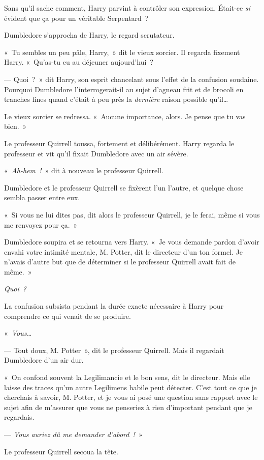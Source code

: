 Sans qu'il sache comment, Harry parvint à contrôler son expression. Était-ce \emph{si} évident que ça pour un véritable Serpentard~?

Dumbledore s'approcha de Harry, le regard scrutateur.

«~Tu sembles un peu pâle, Harry,~» dit le vieux sorcier. Il regarda fixement Harry. «~Qu'as-tu eu au déjeuner aujourd'hui~?

--- Quoi~?~» dit Harry, son esprit chancelant sous l'effet de la confusion soudaine. Pourquoi Dumbledore l'interrogerait-il au sujet d'agneau frit et de brocoli en tranches fines quand c'était à peu près la \emph{dernière} raison possible qu'il…

Le vieux sorcier se redressa. «~Aucune importance, alors. Je pense que tu vas bien.~»

Le professeur Quirrell toussa, fortement et délibérément. Harry regarda le professeur et vit qu'il fixait Dumbledore avec un air sévère.

«~\emph{Ah-hem~!}~» dit à nouveau le professeur Quirrell.

Dumbledore et le professeur Quirrell se fixèrent l'un l'autre, et quelque chose sembla passer entre eux.

«~Si vous ne lui dites pas, dit alors le professeur Quirrell, je le ferai, même si vous me renvoyez pour ça.~»

Dumbledore soupira et se retourna vers Harry. «~Je vous demande pardon d'avoir envahi votre intimité mentale, M. Potter, dit le directeur d'un ton formel. Je n'avais d'autre but que de déterminer si le professeur Quirrell avait fait de même.~»

\emph{Quoi~?}

La confusion subsista pendant la durée exacte nécessaire à Harry pour comprendre ce qui venait de se produire.

«~\emph{Vous…}

--- Tout doux, M. Potter~», dit le professeur Quirrell. Mais il regardait Dumbledore d'un air dur.

«~On confond souvent la Legilimancie et le bon sens, dit le directeur. Mais elle laisse des traces qu'un autre Legilimens habile peut détecter. C'est tout ce que je cherchais à savoir, M. Potter, et je vous ai posé une question sans rapport avec le sujet afin de m'assurer que vous ne penseriez à rien d'important pendant que je regardais.

--- \emph{Vous auriez dû me demander d'abord~!}~»

Le professeur Quirrell secoua la tête.

